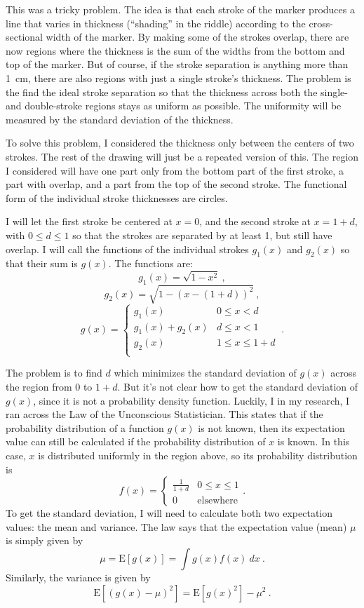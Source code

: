 \documentclass{article}
\begin{document}
This was a tricky problem.
The idea is that each stroke of the marker produces a line that varies in thickness (``shading'' in the riddle) according to the cross-sectional width of the marker.
By making some of the strokes overlap, there are now regions where the thickness is the sum of the widths from the bottom and top of the marker.
But of course, if the stroke separation is anything more than 1~cm, there are also regions with just a single stroke's thickness.
The problem is the find the ideal stroke separation so that the thickness across both the single- and double-stroke regions stays as uniform as possible.
The uniformity will be measured by the standard deviation of the thickness.

To solve this problem, I considered the thickness only between the centers of two strokes.
The rest of the drawing will just be a repeated version of this.
The region I considered will have one part only from the bottom part of the first stroke, a part with overlap, and a part from the top of the second stroke.
The functional form of the individual stroke thicknesses are circles.

I will let the first stroke be centered at $x=0$, and the second stroke at $x=1+d$, with $0\leq d\leq1$ so that the strokes are separated by at least 1, but still have overlap.
I will call the functions of the individual strokes $g_{1}(x)$ and $g_{2}(x)$ so that their sum is $g(x)$.
The functions are:
\[
g_{1}(x)=\sqrt{1-x^{2}}\ ,
\]
\[
g_{2}(x)=\sqrt{1-(x-(1+d))^{2}}\ ,
\]
\[
g(x)=
\begin{cases}
g_{1}(x) & 0\leq x<d \\
g_{1}(x)+g_{2}(x) & d\leq x<1 \\
g_{2}(x) & 1\leq x\leq1+d \\
\end{cases}
\ .
\]

The problem is to find $d$ which minimizes the standard deviation of $g(x)$ across the region from 0 to $1+d$.
But it's not clear how to get the standard deviation of $g(x)$, since it is not a probability density function.
Luckily, I in my research, I ran across the Law of the Unconscious Statistician.
This states that if the probability distribution of a function $g(x)$ is not known, then its expectation value can still be calculated if the probability distribution of $x$ is known.
In this case, $x$ is distributed uniformly in the region above, so its probability distribution is
\[
f(x)=
\begin{cases}
\frac{1}{1+d} & 0\leq x\leq1 \\
0 & \text{elsewhere}
\end{cases}
.
\]
To get the standard deviation, I will need to calculate both two expectation values: the mean and variance.
The law says that the expectation value (mean) $\mu$ is simply given by
\[
\mu=\text{E}[g(x)]=\int g(x)f(x)\ dx\ .
\]
Similarly, the variance is given by
\[
\text{E}\left[(g(x)-\mu)^{2}\right]=\text{E}\left[g(x)^{2}\right]-\mu^{2}\ .
\]
\end{document}
